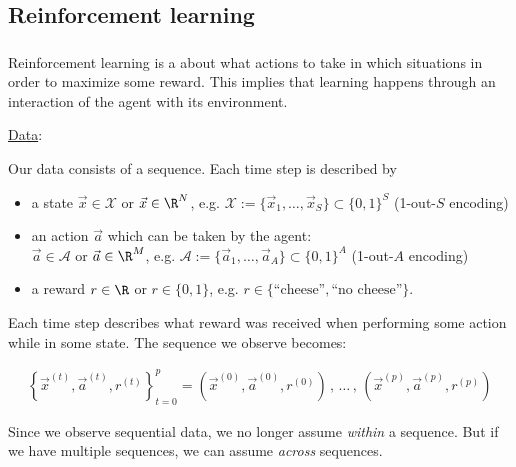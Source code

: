 \newpage

\subsection{Reinforcement learning} \label{sec:reinforcement}

\begin{frame}\frametitle{\subsecname}


Reinforcement learning is a about what actions to take in which situations in order to maximize some reward.
This implies that learning happens through an interaction of the agent with its environment.

\end{frame}

\begin{frame}

\underline{Data}:

Our data consists of a sequence. Each time step is described by 

\begin{itemize}
\item a state $\vec x \in \mathcal{X}$ or $\vec x \in \R^N$, e.g. $\mathcal{X} := \{ \vec x_1, \ldots, \vec x_S\} \subset \{0,1\}^S$ (1-out-$S$ encoding)
\item an action $\vec a$ which can be taken by the agent:\\

$\vec a \in \mathcal{A}$ or $\vec a \in \R^M$, e.g. $\mathcal{A} := \{ \vec a_1, \ldots, \vec a_A\} \subset \{0,1\}^A$ (1-out-$A$ encoding)

\item a reward $r \in \R$ or $r \in \{0,1\}$, e.g. $r \in \{\text{``cheese''},\text{``no cheese''}\}$.

\end{itemize}

Each time step describes what reward was received when performing some action while in some state. 
The sequence we observe becomes:

\begin{align}
\label{eq:chain}
\left\{\vec x^{(t)}, \vec a^{(t)}, r^{(t)}\right\}_{t=0}^{p} = 
\left( \vec x^{(0)}, \vec a^{(0)}, r^{(0)} \right) \,,\, \ldots \,,\, \left(\vec x^{(p)}, \vec a^{(p)}, r^{(p)} \right)
\end{align}




Since we observe sequential data, we no longer assume \iid \emph{within} a sequence. But if we have multiple sequences, we can assume \iid \emph{across} sequences.

\end{frame}

